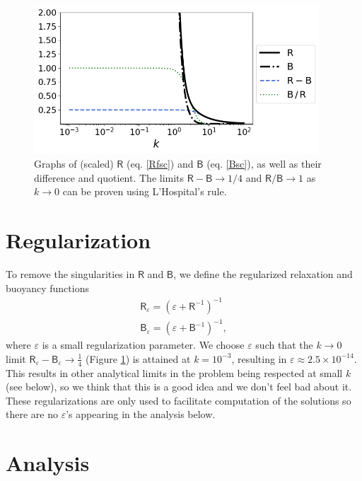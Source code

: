 \documentclass[paper=a4, fontsize=11pt]{article} %
\begin{document}
\begin{figure}
  \centering
\includegraphics[width=0.95\textwidth]{figs/fig2.png}
\caption{Graphs of (scaled) $\mathsf{R}$ (eq. \ref{Rfsc}) and $\mathsf{B}$ (eq. \ref{Bsc}), as well as their difference and quotient. The limits $\mathsf{R}-\mathsf{B}\to 1/4$ and $\mathsf{R}/\mathsf{B}\to 1$
as $k\to 0$ can be proven using L'Hospital's rule.}
\label{fig:RB}
\end{figure}

\section{Regularization}
To remove the singularities in $\mathsf{R}$ and $\mathsf{B}$, we define the regularized
relaxation and buoyancy functions
\begin{eqnarray}
\mathsf{R}_\varepsilon = (\varepsilon + \mathsf{R}^{-1})^{-1}\\
\mathsf{B}_\varepsilon = (\varepsilon + \mathsf{B}^{-1})^{-1},
\end{eqnarray}
where $\varepsilon$ is a small regularization parameter. We choose
$\varepsilon$ such that the $k\to 0$ limit $\mathsf{R}_\varepsilon-\mathsf{B}_\varepsilon\to
\frac{1}{4}$ (Figure \ref{fig:RB}) is attained at $k = 10^{-3}$, resulting in
$\varepsilon \approx 2.5\times 10^{-14}$. This results in other analytical
limits in the problem being respected at small $k$ (see
below), so we think that this is a good idea and we don't feel bad about it.
These regularizations are only used to facilitate computation of the solutions
so there are no $\varepsilon$'s appearing in the analysis below.


\section{Analysis}
\end{document}
